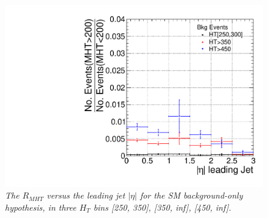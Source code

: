 \begin{figure}[h!]
\centering
\includegraphics[scale=0.4]{./plots/MHT-NT7-Bkg-MCerr}
\caption{\textit{The $R_{MHT}$ versus the leading jet $|\eta|$ for the SM background-only hypothesis, in three $H_{T}$ bins [250, 350], [350, inf], [450, inf].} }
\label{fig:app1}
\end{figure}

